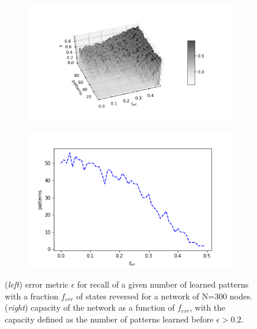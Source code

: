 \documentclass{article}
\begin{document}
\begin{figure}[h]
	\centering
	\begin{subfigure}[t]{0.50\linewidth}
		\centering
		\includegraphics[width = 1.0\linewidth, trim={90 30 50 45}, clip=true]{scan_ferr_npat.png}
		\label{fig:ferr}	
	\end{subfigure}%
	\hspace{0.001\linewidth}
	\begin{subfigure}[t]{0.45\linewidth}
		\centering
		\includegraphics[width = 1.0\linewidth, trim={0 0 0 0}, clip=true]{ferr_thresh.png}
		\label{fig:ferrthresh}	
	\end{subfigure}
	\caption{(\textit{left}) error metric $\epsilon$ for recall of a given number of learned patterns with a fraction $f_{err}$ of states reversed for a network of N=300 nodes. (\textit{right}) capacity of the network as a function of $f_{err}$, with the capacity defined as the number of patterns learned before $\epsilon > 0.2$.}
\end{figure}
\end{document}
